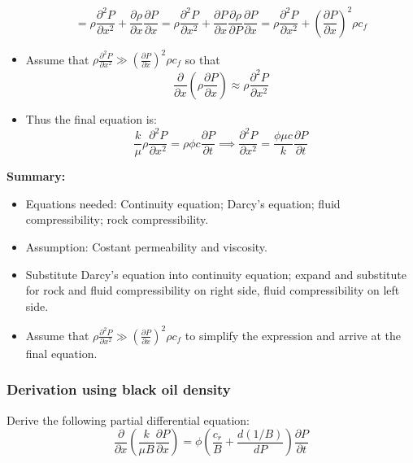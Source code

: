 \begin{itemize}
\begin{equation}
      = \rho\frac{\partial^{2}P}{\partial x^{2}}
      + \frac{\partial\rho}{\partial x}\frac{\partial P}{\partial x}
      = \rho\frac{\partial^{2}P}{\partial x^{2}}
      + \frac{\partial P}{\partial x}\frac{\partial\rho}{\partial P}\frac{\partial P}{\partial x}
      = \rho\frac{\partial^{2}P}{\partial x^{2}}
      + \left(\frac{\partial P}{\partial x}\right)^{2}\rho c_{f}
    \end{equation}
  \item Assume that $\rho\frac{\partial^{2}P}{\partial x^{2}} \gg \left(\frac{\partial P}{\partial x}\right)^{2}\rho c_{f}$ so that
    \begin{equation}
       \frac{\partial}{\partial x}\left(\rho\frac{\partial P}{\partial x}\right)
       \approx  \rho\frac{\partial^{2}P}{\partial x^{2}}
    \end{equation}
  \item Thus the final equation is:
    \begin{equation}
      \frac{k}{\mu} \rho\frac{\partial^{2}P}{\partial x^{2}} = \rho \phi c \frac{\partial P}{\partial t}
      \implies \frac{\partial^{2}P}{\partial x^{2}} = \frac{\phi \mu c}{k}\frac{\partial P}{\partial t}
    \end{equation}
\end{itemize}

\noindent \textbf{Summary:}
\begin{itemize}
  \item Equations needed: Continuity equation; Darcy's equation; fluid compressibility; rock compressibility.
  \item Assumption: Costant permeability and viscosity.
  \item Substitute Darcy's equation into continuity equation; expand and substitute for rock and fluid compressibility on right side, fluid compressibility on left side.
  \item Assume that $\rho\frac{\partial^{2}P}{\partial x^{2}} \gg \left(\frac{\partial P}{\partial x}\right)^{2}\rho c_{f}$ to simplify the expression and arrive at the final equation.
\end{itemize}


\subsubsection{Derivation using black oil density} %
\label{ssub:derivation_using_black_oil_density}

\begin{question}
  Derive the following partial differential equation:
  \begin{equation}
    \frac{\partial }{\partial x} \left( \frac{k}{\mu B} \frac{\partial P}{\partial x} \right)
    = \phi  \left( \frac{c_r}{B} + \frac{d (1/B)}{d P} \right) \frac{\partial P}{\partial t}
  \end{equation}
\end{question}

